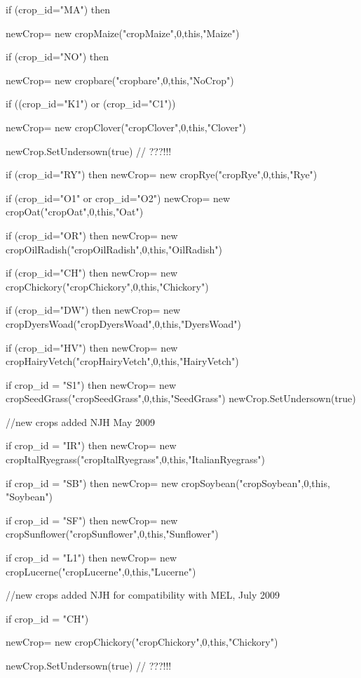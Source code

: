 \documentclass[%
]{scrartcl}
\begin{document}
{{{   if (crop\_id="MA") then

    \quad    newCrop= new cropMaize("cropMaize",0,this,"Maize")
   
   if (crop\_id="NO") then
   
     \quad   newCrop= new cropbare("cropbare",0,this,"NoCrop")
   
   if ((crop\_id="K1") or (crop\_id="C1"))
  
     \quad   newCrop= new cropClover("cropClover",0,this,"Clover")

    \quad    newCrop.SetUndersown(true)  // ???!!!
  
   if (crop\_id="RY") then
      newCrop= new cropRye("cropRye",0,this,"Rye")

   if (crop\_id="O1" or crop\_id="O2")
      newCrop= new cropOat("cropOat",0,this,"Oat")

   if (crop\_id="OR") then
      newCrop= new cropOilRadish("cropOilRadish",0,this,"OilRadish")

   if (crop\_id="CH") then
      newCrop= new cropChickory("cropChickory",0,this,"Chickory")

   if (crop\_id="DW") then
      newCrop= new cropDyersWoad("cropDyersWoad",0,this,"DyersWoad")

   if (crop\_id="HV") then
      newCrop= new cropHairyVetch("cropHairyVetch",0,this,"HairyVetch")

   if crop\_id = "S1") then   
      newCrop= new cropSeedGrass("cropSeedGrass",0,this,"SeedGrass")
      newCrop.SetUndersown(true)
  

   //new crops added NJH May 2009

   if crop\_id = "IR") then
      newCrop= new cropItalRyegrass("cropItalRyegrass",0,this,"ItalianRyegrass")
   
if crop\_id = "SB") then
      newCrop= new cropSoybean("cropSoybean",0,this, "Soybean")
  
if crop\_id = "SF") then
      newCrop= new cropSunflower("cropSunflower",0,this,"Sunflower")
   
if crop\_id = "L1") then   
      newCrop= new cropLucerne("cropLucerne",0,this,"Lucerne")

   //new crops added NJH for compatibility with MEL, July 2009
   
if crop\_id = "CH")
   
    \quad    newCrop= new cropChickory("cropChickory",0,this,"Chickory")
 
    \quad   newCrop.SetUndersown(true)  // ???!!!
   
}}}
\end{document}
